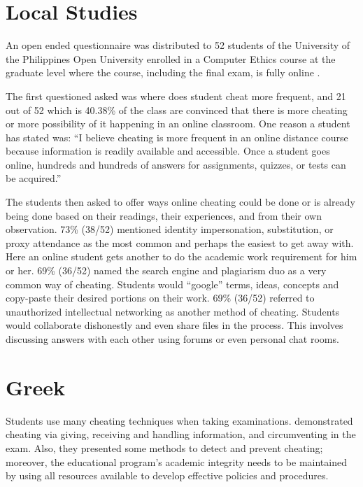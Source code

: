 \section{Local Studies}

An open ended questionnaire was distributed to 52 students of the University of the Philippines Open University enrolled in a Computer Ethics course at the graduate level where the course, including the final exam, is fully online \cite{ravasco2012technology}.

The first questioned asked was where does student cheat more frequent, and 21 out of 52 which is 40.38\% of the class are convinced that there is more cheating or more possibility of it happening in an online classroom.
One reason a student has stated was: “I believe cheating is more frequent in an online distance course because information is readily available and accessible. Once a student goes online, hundreds and hundreds of answers for assignments, quizzes, or tests can be acquired.”

The students then asked to offer ways online cheating could be done or is already being done based on their readings, their experiences, and from their own observation.
73\% (38/52) mentioned identity impersonation, substitution, or proxy attendance as the most common and perhaps the easiest to get away with.
Here an online student gets another to do the academic work requirement for him or her.
69\% (36/52) named the search engine and plagiarism duo as a very common way of cheating.
Students would “google” terms, ideas, concepts and copy-paste their desired portions on their work.
69\% (36/52) referred to unauthorized intellectual networking as another method of cheating.
Students would collaborate dishonestly and even share files in the process.
This involves discussing answers with each other using forums or even personal chat rooms.

\section{Greek}

Students use many cheating techniques when taking examinations.
 demonstrated cheating via giving, receiving and handling information, and circumventing in the exam.
Also, they presented some methods to detect and prevent cheating; moreover, the educational program's academic integrity needs to be maintained by using all resources available to develop effective policies and procedures.

